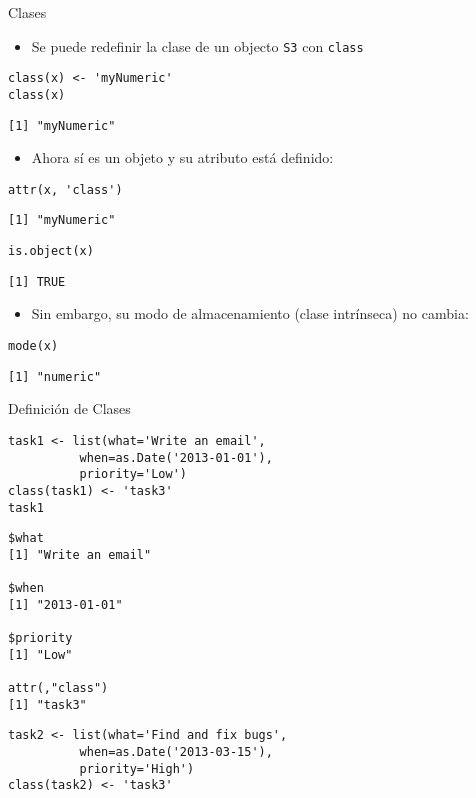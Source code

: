 \documentclass[xcolor={usenames,svgnames,dvipsnames}]{beamer}
\begin{document}
\begin{frame}[fragile,label=sec-2-1-2]{Clases}
 \begin{itemize}
\item Se puede redefinir la clase de un objecto \texttt{S3} con \texttt{class}
\end{itemize}
\lstset{language=R,numbers=none}
\begin{lstlisting}
class(x) <- 'myNumeric'
class(x)
\end{lstlisting}

\begin{verbatim}
[1] "myNumeric"
\end{verbatim}

\begin{itemize}
\item Ahora sí es un objeto y su atributo está definido:
\end{itemize}
\lstset{language=R,numbers=none}
\begin{lstlisting}
attr(x, 'class')
\end{lstlisting}

\begin{verbatim}
[1] "myNumeric"
\end{verbatim}

\lstset{language=R,numbers=none}
\begin{lstlisting}
is.object(x)
\end{lstlisting}

\begin{verbatim}
[1] TRUE
\end{verbatim}

\begin{itemize}
\item Sin embargo, su modo de almacenamiento (clase intrínseca) no cambia:
\end{itemize}
\lstset{language=R,numbers=none}
\begin{lstlisting}
mode(x)
\end{lstlisting}

\begin{verbatim}
[1] "numeric"
\end{verbatim}
\end{frame}
\begin{frame}[fragile,label=sec-2-1-3]{Definición de Clases}
 \lstset{language=R,numbers=none}
\begin{lstlisting}
task1 <- list(what='Write an email',
	      when=as.Date('2013-01-01'),
	      priority='Low')
class(task1) <- 'task3'
task1
\end{lstlisting}

\begin{verbatim}
$what
[1] "Write an email"

$when
[1] "2013-01-01"

$priority
[1] "Low"

attr(,"class")
[1] "task3"
\end{verbatim}

\lstset{language=R,numbers=none}
\begin{lstlisting}
task2 <- list(what='Find and fix bugs',
	      when=as.Date('2013-03-15'),
	      priority='High')
class(task2) <- 'task3'
\end{lstlisting}
\end{frame}
\end{document}
